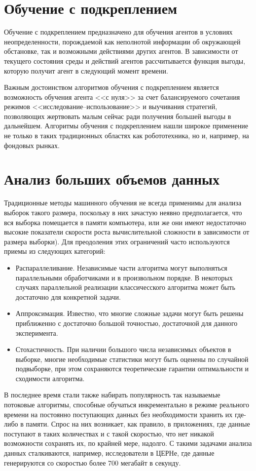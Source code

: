 \section{Обучение с подкреплением}
Обучение с подкреплением предназначено для обучения агентов в условиях неопределенности, порождаемой
как неполнотой информации об окружающей обстановке, так и возможными действиями других агентов. В
зависимости от текущего состояния среды и действий агентов рассчитывается функция выгоды, которую
получит агент в следующий момент времени.

Важным достоинством алгоритмов обучения с подкреплением является возможность обучения агента <<с нуля>>
за счет балансируемого сочетания режимов <<исследование--использование>> и выучивания стратегий,
позволяющих жертвовать малым сейчас ради получения большей выгоды в дальнейшем. Алгоритмы обучения с
подкреплением нашли широкое применение не только в таких традиционных областях как робототехника, но и,
например, на фондовых рынках.

\section{Анализ больших объемов данных}
Традиционные методы машинного обучения не всегда применимы для анализа выборок такого размера, поскольку
в них зачастую неявно предполагается, что вся выборка помещается в памяти компьютера, или же они имеют
недостаточно высокие показатели скорости роста вычислительной сложности в зависимости от размера
выборки). Для преодоления этих ограничений часто используются приемы из следующих категорий:
\begin{itemize}
  \item Распараллеливание. Независимые части алгоритма могут выполняться параллельными обработчиками и
    в произвольном порядке. В некоторых случаях параллельной реализации классичесского алгоритма может
    быть достаточно для конкретной задачи.
  \item Аппроксимация. Известно, что многие сложные задачи могут быть решены приближенно с достаточно
    большой точностью, достаточной для данного эксперимента.
  \item Стохастичность. При наличии большого числа независимых объектов в выборке, многие необходимые
    статистики могут быть оценены по случайной подвыборке, при этом сохраняются теоретические гарантии
    оптимальности и сходимости алгоритма.
\end{itemize}

В последнее время стали также набирать популярность так называемые потоковые алгоритмы, способные
обучаться инкрементально в режиме реального времени на постоянно поступающих данных без необходимости
хранить их где-либо в памяти. Спрос на них возникает, как правило, в приложениях, где данные поступают
в таких количествах и с такой скоростью, что нет никакой возможности сохранять их, по крайней мере,
надолго. С такими задачами анализа данных сталкиваются, например, исследователи в ЦЕРНе, где данные
генерируются со скоростью более 700 мегабайт в секунду.


